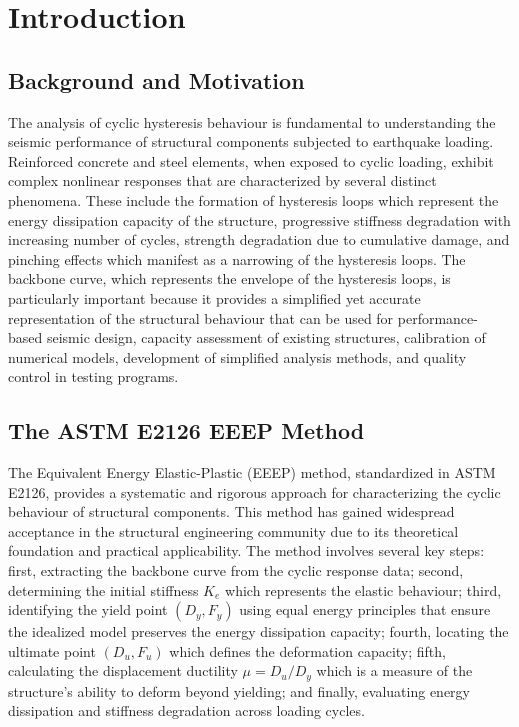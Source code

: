\documentclass[11pt,a4paper]{article}
\begin{document}

\tableofcontents
\newpage


\listoftables
\newpage

\section{Introduction}

\subsection{Background and Motivation}

The analysis of cyclic hysteresis behaviour is fundamental to understanding the seismic performance of structural components subjected to earthquake loading. Reinforced concrete and steel elements, when exposed to cyclic loading, exhibit complex nonlinear responses that are characterized by several distinct phenomena. These include the formation of hysteresis loops which represent the energy dissipation capacity of the structure, progressive stiffness degradation with increasing number of cycles, strength degradation due to cumulative damage, and pinching effects which manifest as a narrowing of the hysteresis loops. The backbone curve, which represents the envelope of the hysteresis loops, is particularly important because it provides a simplified yet accurate representation of the structural behaviour that can be used for performance-based seismic design, capacity assessment of existing structures, calibration of numerical models, development of simplified analysis methods, and quality control in testing programs.

\subsection{The ASTM E2126 EEEP Method}

The Equivalent Energy Elastic-Plastic (EEEP) method, standardized in ASTM E2126, provides a systematic and rigorous approach for characterizing the cyclic behaviour of structural components. This method has gained widespread acceptance in the structural engineering community due to its theoretical foundation and practical applicability. The method involves several key steps: first, extracting the backbone curve from the cyclic response data; second, determining the initial stiffness \(K_e\) which represents the elastic behaviour; third, identifying the yield point \((D_y, F_y)\) using equal energy principles that ensure the idealized model preserves the energy dissipation capacity; fourth, locating the ultimate point \((D_u, F_u)\) which defines the deformation capacity; fifth, calculating the displacement ductility \(\mu = D_u / D_y\) which is a measure of the structure's ability to deform beyond yielding; and finally, evaluating energy dissipation and stiffness degradation across loading cycles.
\end{document}

